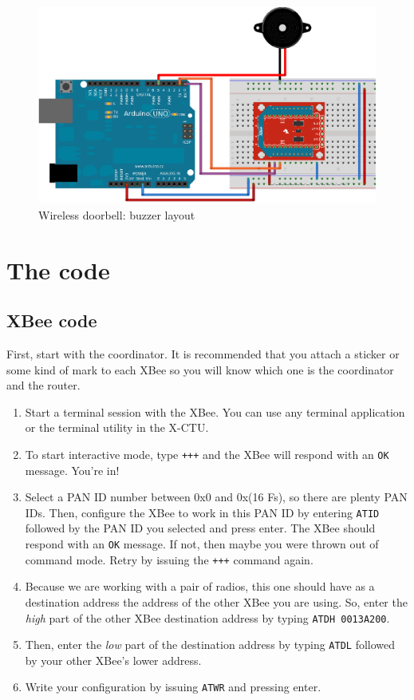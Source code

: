 \begin{figure}[htbp]
  \centering
  \includegraphics[width=\linewidth]{figures/doorbellBuzzer-NEW.eps}
  \caption{Wireless doorbell: buzzer layout
  \label{fig:wirelessDoorbellBuzzer}}
\end{figure}

\section{The code}\label{wirelessDoorbellCode}
\subsection{XBee code}

First, start with the coordinator. It is recommended that you attach a sticker or some kind of mark to each XBee so you will know which one is the coordinator and the router.
\begin{enumerate}
  \item Start a terminal session with the XBee. You can use any terminal application or the terminal utility in the X-CTU.
  \item To start interactive mode, type \texttt{+++} and the XBee will respond with an \texttt{OK} message. You're in!
  \item Select a PAN ID number between 0x0 and 0x(16 Fs), so there are plenty PAN IDs. Then, configure the XBee to work in this PAN ID by entering \texttt{ATID} followed by the PAN ID you selected and press enter. The XBee should respond with an \texttt{OK} message. If not, then maybe you were thrown out of command mode. Retry by issuing the \texttt{+++} command again.
  \item Because we are working with a pair of radios, this one should have as a destination address the address of the other XBee you are using. So, enter the \emph{high} part of the other XBee destination address by typing \texttt{ATDH 0013A200}.
  \item Then, enter the \emph{low} part of the destination address by typing \texttt{ATDL} followed by your other XBee's lower address.
  \item Write your configuration by issuing \texttt{ATWR} and pressing enter.
\end{enumerate}


